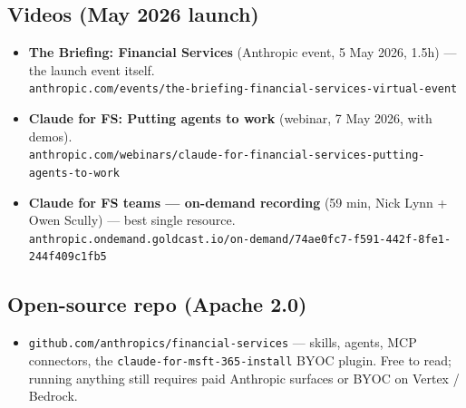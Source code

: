 \documentclass[10pt,a4paper]{article}
\begin{document}
\subsection*{Videos (May 2026 launch)}
\begin{itemize}
  \item \textbf{The Briefing: Financial Services} (Anthropic event, 5 May 2026, 1.5h) --- the launch event itself.\\
        \texttt{anthropic.com/events/the-briefing-financial-services-virtual-event}
  \item \textbf{Claude for FS: Putting agents to work} (webinar, 7 May 2026, with demos).\\
        \texttt{anthropic.com/webinars/claude-for-financial-services-putting-agents-to-work}
  \item \textbf{Claude for FS teams --- on-demand recording} (59 min, Nick Lynn + Owen Scully) --- best single resource.\\
        \texttt{anthropic.ondemand.goldcast.io/on-demand/74ae0fc7-f591-442f-8fe1-244f409c1fb5}
\end{itemize}

\subsection*{Open-source repo (Apache 2.0)}
\begin{itemize}
  \item \texttt{github.com/anthropics/financial-services} --- skills, agents, MCP connectors, the \texttt{claude-for-msft-365-install} BYOC plugin. Free to read; running anything still requires paid Anthropic surfaces or BYOC on Vertex / Bedrock.
\end{itemize}
\normalsize

\vfill
{}
\end{document}
